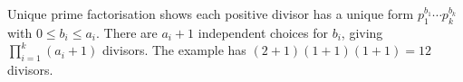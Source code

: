 Unique prime factorisation shows each positive divisor has a unique form $ p_1^{b_1}\cdots p_k^{b_k}$ with $ 0\le b_i\le a_i $. There are $ a_i+1 $ independent choices for $ b_i $, giving $\boxed{\prod_{i=1}^k(a_i+1)}$ divisors. The example has $(2+1)(1+1)(1+1)=\boxed{12}$ divisors.
